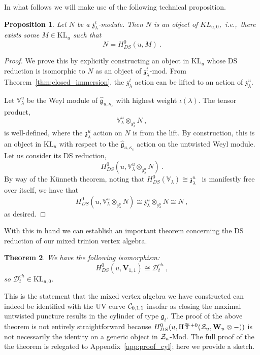 \documentclass[a4paper]{article}
\newtheorem{thm}{Theorem}[section]
\newtheorem{prop}[thm]{Proposition}
\def\IV{\mathbb{V}}
\def\CC{{\cal C}}
\def\ZZ{{\cal Z}}
\def\gf{\mathfrak{g}}
\def \zf{\mathfrak{z}}
\def \ie{{\it i.e.}}
\def \KL{\mathrm{KL}}
\newcommand{\Hi}[1]{\mathrm{H}^{\frac{\infty}{2}+#1}}
\def\D{\mathcal{D}^{ch}}
\def\W{\mathbf{W}}
\def\V{\mathbf{V}}
\begin{document}
In what follows we will make use of the following technical proposition.
\begin{prop}\label{prop:kl_u}
Let $N$ be a $\zf^t_\lambda$-module. Then $N$ is an object of $KL_{u,0}$,~\ie,~there exists some $M\in\KL_u$ such that
\begin{equation*}
	N = H^0_{DS}(u,M)~.
\end{equation*}
\end{prop}
\begin{proof}
We prove this by explicitly constructing an object in $\KL_u$ whose DS reduction is isomorphic to $N$ as an object of $\zf^t_\lambda$-mod. From Theorem~\ref{thm:closed_immersion}, the $\zf^t_{\lambda}$ action can be lifted to an action of $\mathfrak{z}^u_{\lambda}$.

Let $\IV_\lambda^u$ be the Weyl module of $\hat{\gf}_{u,\kappa_c}$ with highest weight $\iota(\lambda)$. The tensor product,
\begin{equation*}
	\IV_\lambda^u\otimes_{\zf_\lambda^u} N~,
\end{equation*}
is well-defined, where the $\zf_\lambda^u$ action on $N$ is from the lift. By construction, this is an object in $\KL_u$ with respect to the $\hat{\gf}_{u,\kappa_c}$ action on the untwisted Weyl module. Let us consider its DS reduction,
\begin{equation*}
	H^0_{DS}(u,\IV_\lambda^u\otimes_{\zf_\lambda^u} N)~.
\end{equation*}
By way of the K\"unneth theorem, noting that $H^0_{DS}(\IV_\lambda)\cong\zf_\lambda^u$~\cite{Frenkel:2010} is manifestly free over itself, we have that
\begin{equation*}
	H^0_{DS}(u,\IV_\lambda^u\otimes_{\zf_\lambda^u} N) \cong \zf^u_\lambda\otimes_{\zf_\lambda^u}N \cong N~,
\end{equation*}
as desired.
\end{proof}
With this in hand we can establish an important theorem concerning the DS reduction of our mixed trinion vertex algebra.
\begin{thm}\label{thm:cyl_kl0}
We have the following isomorphism:
\begin{equation*}
H^0_{DS}(u,\V_{1,1}) \cong \D_t~,
\end{equation*}
so $\D_t \in \KL_{u,0}$.
\end{thm}
This is the statement that the mixed vertex algebra we have constructed can indeed be identified with the UV curve $\CC_{0,1,1}$ insofar as closing the maximal untwisted puncture results in the cylinder of type $\gf_t$. The proof of the above theorem is not entirely straightforward because $H^0_{DS}(u,\Hi{0}(\ZZ_u,\W_u\otimes -))$ is not necessarily the identity on a generic object in $\ZZ_u$-Mod. The full proof of the the theorem is relegated to Appendix~\ref{app:proof_cyl}; here we provide a sketch.
\end{document}
